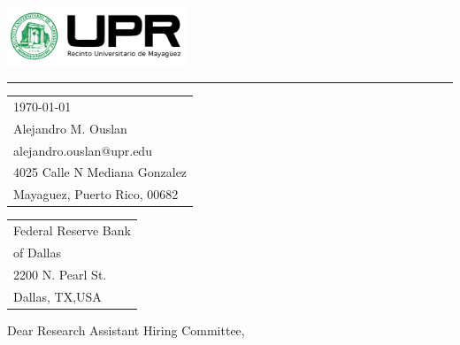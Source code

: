 \documentclass{article}
\begin{document}

\includegraphics[width=0.4\textwidth]{../assets/logo.png} %

\vspace{-1em} %

\rule{\linewidth}{1pt} %

\bigskip\bigskip %


\hfill
\begin{tabular}{l @{}}
\hfill \today \bigskip\\ %
\hfill Alejandro M. Ouslan \\
\hfill alejandro.ouslan@upr.edu \\
\hfill 4025 Calle N Mediana Gonzalez\\
\hfill Mayaguez, Puerto Rico, 00682 \\
\end{tabular}

\bigskip %


\begin{tabular}{@{} l}
Federal Reserve Bank \\ 
of Dallas \\
2200 N. Pearl St.\\
Dallas, TX,USA\\
\end{tabular}


\bigskip %

Dear Research Assistant Hiring Committee,

\bigskip %
\end{document}

